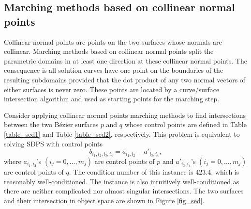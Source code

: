 \documentclass{article}
\begin{document}
\subsection{Marching methods based on collinear normal points}
\label{section_sederberg}
Collinear normal points are points on the two surfaces whose normals
are collinear.  Marching methods based on collinear normal points
split the parametric domains in at least one direction at these
collinear normal points.  The consequence is all solution curves
have one point on the boundaries of the resulting subdomains provided
that the dot product of any two normal vectors of either surfaces is
never zero.  These points are located by a curve/surface intersection
algorithm and used as starting points for the marching step.

Consider applying collinear normal points marching methods to find
intersections between the two B\'{e}zier surfaces $p$ and $q$ whose
control points are defined in Table \ref{table_sed1} and Table
\ref{table_sed2}, respectively.  This problem is equivalent to solving SDPS with control points
\[
b_{i_1,i_2,i_3,i_4} = a_{i_1,i_2} - a'_{i_3,i_4}, 
\]
where $a_{i_1,i_2}$'s $(i_j = 0, \ldots, m_j)$ are control points of $p$ and $a'_{i_3,i_4}$'s $(i_j = 0, \ldots, m_j)$ are control points of $q$.
The condition number of this instance
is $423.4$, which is reasonably well-conditioned.  The instance
is also intuitively well-conditioned as there are neither complicated
nor almost singular intersections.  The two surfaces and their
intersection in object space are shown in Figure \ref{fig_sed}.
\end{document}
